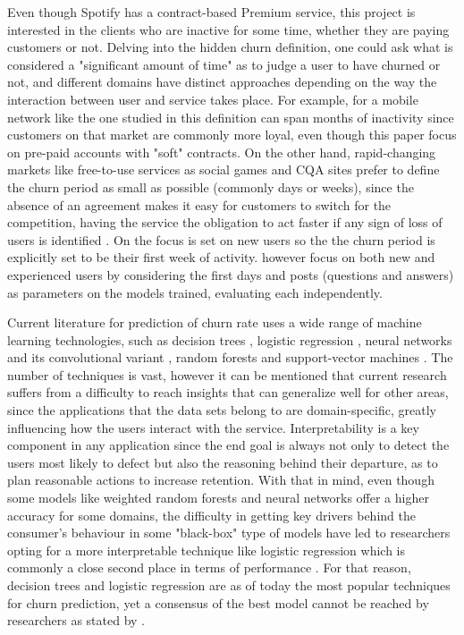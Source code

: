 \documentclass{kththesis}
\begin{document}
Even though Spotify has a contract-based Premium service, this project is interested in the clients who are inactive for some time, whether they are paying customers or not. Delving into the hidden churn definition, one could ask what is considered a "significant amount of time" as to judge a user to have churned or not, and different domains have distinct approaches depending on the way the interaction between user and service takes place. For example, for a mobile network like the one studied in \citep{Khan2015} this definition can span months of inactivity since customers on that market are commonly more loyal, even though this paper focus on pre-paid accounts with "soft" contracts. On the other hand, rapid-changing markets like free-to-use services as social games and CQA sites prefer to define the churn period as small as possible (commonly days or weeks), since the absence of an agreement makes it easy for customers to switch for the competition, having the service the obligation to act faster if any sign of loss of users is identified \citep{Khan2015}\citep{Drachen2016RapidPO}. On \citep{Dror2012} the focus is set on new users so the the churn period is explicitly set to be their first week of activity. \citep{Pudipeddi2014} however focus on both new and experienced users by considering the first days and posts (questions and answers) as parameters on the models trained, evaluating each independently.

Current literature for prediction of churn rate uses a wide range of machine learning technologies, such as decision trees \citep{Pudipeddi2014}\citep{Hassouna2015} \citep{Ballings2012} \citep{Khan2015}, logistic regression \citep{GurAli2014}, neural networks \citep{Runge2014} and its convolutional variant \citep{Wangperawong2016}, random forests \citep{Dror2012} and support-vector machines \citep{coussement2008churn}. The number of techniques is vast, however it can be mentioned that current research suffers from a difficulty to reach insights that can generalize well for other areas, since the applications that the data sets belong to are domain-specific, greatly influencing how the users interact with the service. Interpretability is a key component in any application since the end goal is always not only to detect the users most likely to defect but also the reasoning behind their departure, as to plan reasonable actions to increase retention. With that in mind, even though some models like weighted random forests \citep{Burez2009} and neural networks \citep{Runge2014} offer a higher accuracy for some domains, the difficulty in getting key drivers behind the consumer's behaviour in some "black-box" type of models have led to researchers opting for a more interpretable technique like logistic regression which is commonly a close second place in terms of performance \citep{Runge2014} \citep{Dror2012}. For that reason, decision trees and logistic regression are as of today the most popular techniques for churn prediction, yet a consensus of the best model cannot be reached by researchers as stated by \citep{mahajan2015review}. 
\end{document}

